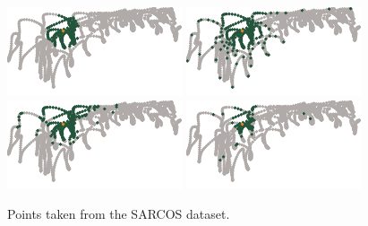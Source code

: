 \documentclass[review,supplement,onefignum,onetabnum]{siamonline220329}
\begin{document}
\begin{figure}[H]
  \centering
  \includegraphics{figures/precompiled/sarcos3/points_1.pdf}%
  \quad
  \includegraphics{figures/precompiled/sarcos3/points_2.pdf}%
  \quad
  \includegraphics{figures/precompiled/sarcos3/points_3.pdf}%
  \quad
  \includegraphics{figures/precompiled/sarcos3/points_4.pdf}%
  \caption{%
    Points taken from the SARCOS dataset.
  }
\end{figure}



\end{document}
